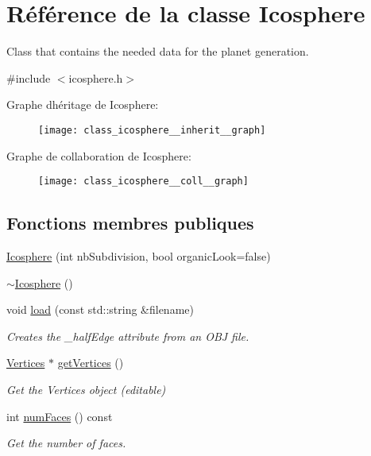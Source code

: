 \hypertarget{class_icosphere}{}\section{Référence de la classe Icosphere}
\label{class_icosphere}


Class that contains the needed data for the planet generation.  




{\ttfamily \#include $<$icosphere.\+h$>$}



Graphe d\textquotesingle{}héritage de Icosphere\+:\nopagebreak
\begin{figure}[H]
\begin{center}
\leavevmode
\texttt{[image: class\_icosphere\_\_inherit\_\_graph]}
\end{center}
\end{figure}


Graphe de collaboration de Icosphere\+:\nopagebreak
\begin{figure}[H]
\begin{center}
\leavevmode
\texttt{[image: class\_icosphere\_\_coll\_\_graph]}
\end{center}
\end{figure}
\subsection*{Fonctions membres publiques}
\begin{DoxyCompactItemize}
\item 
\hyperlink{class_icosphere_acbbb6a69f296101cbf883e8b17d0e24f}{Icosphere} (int nb\+Subdivision, bool organic\+Look=false)
\item 
\hyperlink{class_icosphere_ac9473c8c8d6085b6370d95772b898a45}{$\sim$\+Icosphere} ()
\item 
void \hyperlink{class_icosphere_a1b20bf118a66f5202228a5a4522bd7fd}{load} (const std\+::string \&filename)
\begin{DoxyCompactList}\small\item\em Creates the \+\_\+half\+Edge attribute from an O\+BJ file. \end{DoxyCompactList}\item 
\hyperlink{struct_shape_1_1_vertices}{Vertices} $\ast$ \hyperlink{class_icosphere_aae0a9d0e0cff48ca120bd401e2cb14f4}{get\+Vertices} ()
\begin{DoxyCompactList}\small\item\em Get the Vertices object (editable) \end{DoxyCompactList}\item 
int \hyperlink{class_icosphere_a4bacbf52b66b1c6b3e80380a0bb4c9e5}{num\+Faces} () const
\begin{DoxyCompactList}\small\item\em Get the number of faces. \end{DoxyCompactList}\end{DoxyCompactItemize}
